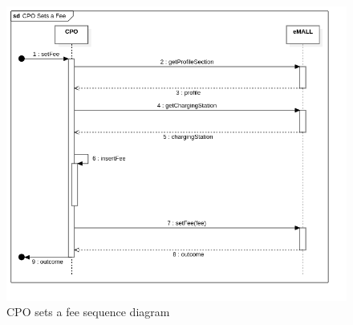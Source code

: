 \begin{center}
    \begin{figure} [H]
        \begin{center}
            \includegraphics[width=0.9\linewidth]{Images/SequenceDiagrams/cpo_sets_a_fee}
            \caption{CPO sets a fee sequence diagram}
            \label{fig: cpo_sets_fee_seq_diag}
        \end{center}
    \end{figure}
\end{center}

\newpage

